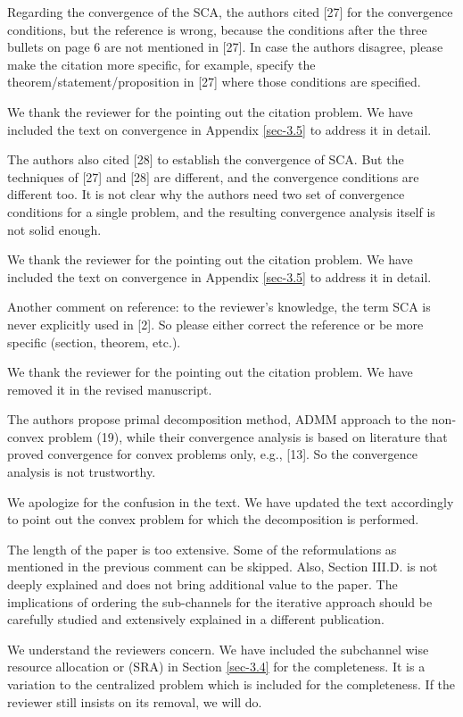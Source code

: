 \begin{itemize}
 Regarding the convergence of the SCA, the authors cited [27] for the convergence conditions, but the reference is wrong, because the conditions after the three bullets on page 6 are not mentioned in [27]. In case the authors disagree, please make the citation more specific, for example, specify the theorem/statement/proposition in [27] where those conditions are specified.

\resp We thank the reviewer for the pointing out the citation problem. We have included the text on convergence in Appendix \ref{sec-3.5} to address it in detail.

 The authors also cited [28] to establish the convergence of SCA. But the techniques of [27] and [28] are different, and the convergence conditions are different too. It is not clear why the authors need two set of convergence conditions for a single problem, and the resulting convergence analysis itself is not solid enough.

\resp We thank the reviewer for the pointing out the citation problem. We have included the text on convergence in Appendix \ref{sec-3.5} to address it in detail.

 Another comment on reference: to the reviewer's knowledge, the term SCA is never explicitly used in [2]. So please either correct the reference or be more specific (section, theorem, etc.).

\resp We thank the reviewer for the pointing out the citation problem. We have removed it in the revised manuscript.

 The authors propose primal decomposition method, ADMM approach to the non-convex problem (19), while their convergence analysis is based on literature that proved convergence for convex problems only, e.g., [13]. So the convergence analysis is not trustworthy.

\resp We apologize for the confusion in the text. We have updated the text accordingly to point out the convex problem for which the decomposition is performed.

 The length of the paper is too extensive. Some of the reformulations as mentioned in the previous comment can be skipped. Also, Section III.D. is not deeply explained and does not bring additional value to the paper. The implications of ordering the sub-channels for the iterative approach should be carefully studied and extensively explained in a different publication.

\resp We understand the reviewers concern. We have included the subchannel wise resource allocation or (SRA) in Section \ref{sec-3.4} for the completeness. It is a variation to the centralized problem which is included for the completeness. If the reviewer still insists on its removal, we will do.


\end{itemize}
